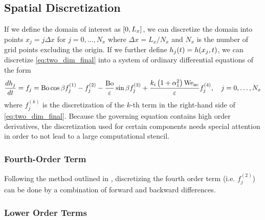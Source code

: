 \subsection{Spatial Discretization}
If we define the domain of interest as $\left[ 0, L_x \right]$, we can discretize the 
domain into points $x_j = j\Delta x$ for $j = 0, \ldots, N_x$ where 
$\Delta x = L_x / N_x$ and $N_x$ is the number of grid points excluding the origin. 
If we further define $h_j\!\left( t \right) = h\!\left( x_j, t \right)$, we can discretize 
\cref{eq:two_dim_final} into a system of ordinary differential equations of the form 
\begin{equation}
    \frac{d h_j}{d t} = f_j = \mathrm{Bo}\cos \beta f_j^{(1)} - f_j^{(2)} -  \frac{\mathrm{Bo}}{\varepsilon} \sin \beta f_j^{(3)} +  
    \frac{k_i \left( 1 + \alpha_1^2 \right) \mathrm{We_{ac}}}{\varepsilon} f_j^{(4)}, \quad j = 0, \ldots, N_x
    \label{eq:ode_sys}
\end{equation}
where $f_j^{(k)}$ is the discretization of the $k$-th term in
the right-hand side of \cref{eq:two_dim_final}. Because the governing equation 
contains high order derivatives, the discretization used for certain components 
needs special attention in order to not lead to a large computational stencil.

\subsubsection{Fourth-Order Term}
Following the method outlined in \cite{kondic2003instabilities}, discretizing the fourth order term (i.e.\! $f_j^{(2)}$) can be done by a combination
of forward and backward differences. 

\subsubsection{Lower Order Terms}
